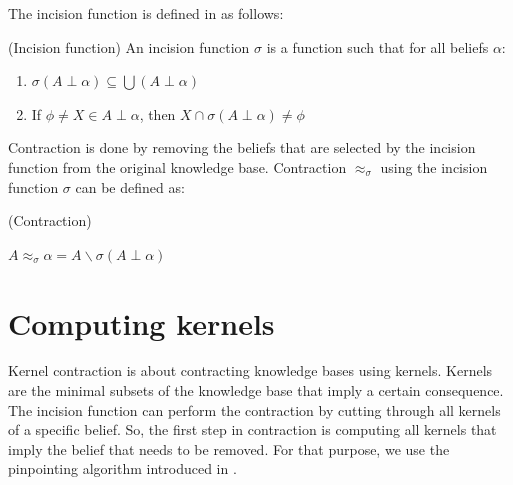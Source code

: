 The incision function is defined in \cite{hansson} as follows:
\begin{defn}(Incision function)
An incision function $\sigma$ is a function such that for all beliefs $\alpha$:
\begin{enumerate}
\item $\sigma (A \perp \alpha) \subseteq \bigcup (A \perp \alpha)$
\item If $\phi \neq X \in A \perp \alpha$, then $X \cap \sigma (A \perp \alpha) \neq \phi$
\end{enumerate}
\end{defn}
Contraction is done by removing the beliefs that are selected by the incision function from the original knowledge base. Contraction $\approx_\sigma$ using the incision function $\sigma$ can be defined as:
\begin{defn}\cite{hansson} (Contraction)
\begin{center}
$A \approx_\sigma \alpha = A \smallsetminus \sigma (A \perp \alpha)$
\end{center}
\end{defn}


\section{Computing kernels}
Kernel contraction is about contracting knowledge bases using kernels. Kernels are the minimal subsets of the knowledge base that imply a certain consequence. The incision function can perform the contraction by cutting through all kernels of a specific belief. So, the first step in contraction is computing all kernels that imply the belief that needs to be removed. For that purpose, we use the pinpointing algorithm introduced in \cite{pin}.

